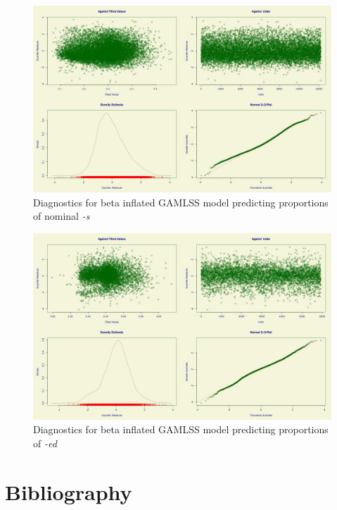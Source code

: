 \documentclass[
]{article}
\begin{document}
\begin{figure}
     \centering
     \includegraphics[width=\textwidth]{figures/m_noun_diagnostic.jpg}
     \caption{Diagnostics for beta inflated GAMLSS model predicting proportions of nominal \textit{-s}}
     \label{noun_diagnostics}
\end{figure}

\begin{figure}
     \centering
     \includegraphics[width=\textwidth]{figures/m_ed_diagnostic.jpg}
     \caption{Diagnostics for beta inflated GAMLSS model predicting proportions of \textit{-ed}}
     \label{ed_diagnostics}
\end{figure}

\newpage

\hypertarget{bibliography}{%
\section{Bibliography}\label{bibliography}}
\end{document}
